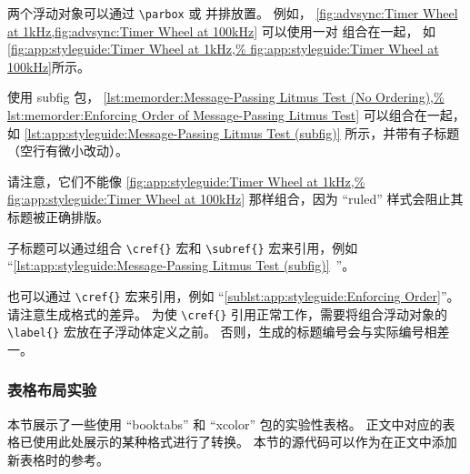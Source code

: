 两个浮动对象可以通过 \texttt{\textbackslash parbox} 或
 并排放置。
例如，
\cref{fig:advsync:Timer Wheel at 1kHz,fig:advsync:Timer Wheel at 100kHz}
可以使用一对  组合在一起，
如\cref{fig:app:styleguide:Timer Wheel at 1kHz,%
fig:app:styleguide:Timer Wheel at 100kHz}所示。

使用 subfig 包，
\cref{lst:memorder:Message-Passing Litmus Test (No Ordering),%
lst:memorder:Enforcing Order of Message-Passing Litmus Test}
可以组合在一起，如
\cref{lst:app:styleguide:Message-Passing Litmus Test (subfig)}
所示，并带有子标题（空行有微小改动）。

请注意，它们不能像
\cref{fig:app:styleguide:Timer Wheel at 1kHz,%
fig:app:styleguide:Timer Wheel at 100kHz}
那样组合，因为 ``ruled'' 样式会阻止其标题被正确排版。

子标题可以通过组合 \verb|\cref{}| 宏和
\verb|\subref{}| 宏来引用，例如
``\cref{lst:app:styleguide:Message-Passing Litmus Test (subfig)}\,%
''。

也可以通过 \verb|\cref{}| 宏来引用，例如
``\cref{sublst:app:styleguide:Enforcing Order}''。
请注意生成格式的差异。
为使 \verb|\cref{}| 引用正常工作，需要将组合浮动对象的
\verb|\label{}| 宏放在子浮动体定义之前。
否则，生成的标题编号会与实际编号相差一。

\subsubsection{表格布局实验}
\label{sec:app:styleguide:Table Layout Experiment}

本节展示了一些使用 ``booktabs'' 和 ``xcolor'' 包的实验性表格。
正文中对应的表格已使用此处展示的某种格式进行了转换。
本节的源代码可以作为在正文中添加新表格时的参考。

